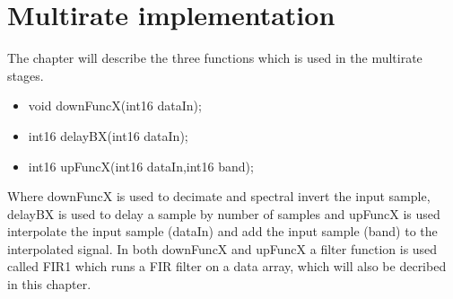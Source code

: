 \chapter{Multirate implementation}
The chapter will describe the three functions which is used in the multirate stages.
\begin{itemize}
\item void downFuncX(int16 dataIn);
\item int16 delayBX(int16 dataIn);
\item int16 upFuncX(int16 dataIn,int16 band);
\end{itemize}
Where downFuncX is used to decimate and spectral invert the input sample, delayBX is used to delay a sample by number of samples and upFuncX is used interpolate the input sample (dataIn) and add the input sample (band) to the interpolated signal. In both downFuncX and upFuncX a filter function is used called FIR1 which runs a FIR filter on a data array, which will also be decribed in this chapter. 


